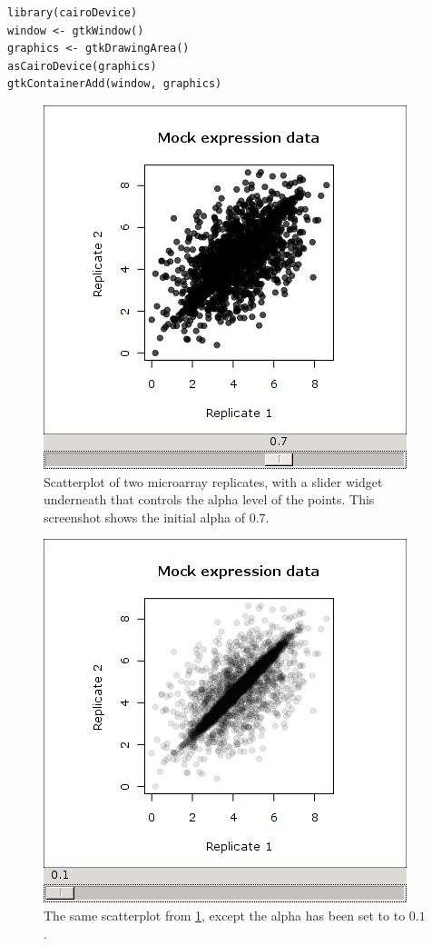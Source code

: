 \documentclass[article]{jss}
\begin{document}
\begin{verbatim}
library(cairoDevice)
window <- gtkWindow()
graphics <- gtkDrawingArea()
asCairoDevice(graphics)
gtkContainerAdd(window, graphics)
\end{verbatim}

\begin{figure}
\begin{center}
\includegraphics[scale=0.5]{demo-alpha-random-07-3}
\caption{\label{fig:rgtk2-demo-initial}Scatterplot of two microarray replicates,
with a slider widget underneath that controls the alpha level of the
points. This screenshot shows the initial alpha of $0.7$.}
\end{center}
\end{figure}

\begin{figure}
\begin{center}
\includegraphics[scale=0.5]{demo-alpha-random-01-3}
\caption{\label{fig:rgtk2-demo-final}The same scatterplot from 
\ref{fig:rgtk2-demo-initial}, except the alpha has been set to to $0.1$.}
\end{center}
\end{figure}
\end{document}
